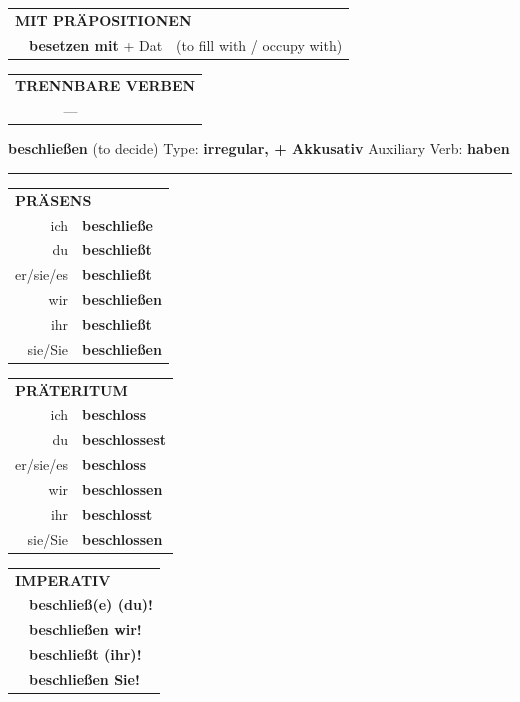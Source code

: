 \documentclass[10pt,a4paper]{revtex4-2}
\begin{document}
\begin{verbbox-acc}
\vspace{10pt}

\begin{tabular}{lll}
\multicolumn{3}{l}{\textbf{MIT PRÄPOSITIONEN}}\\
& \textbf{besetzen mit} + Dat & (to fill with / occupy with)\\
\end{tabular}
\hfill
\begin{tabular}{lll}
\multicolumn{3}{l}{\textbf{TRENNBARE VERBEN}}\\
& ---\\
\end{tabular}
\vspace{-5pt}
\end{verbbox-acc}

\begin{verbbox-acc}
{\Large \bf beschließen} (to decide) \hfill Type: \textbf{irregular, + Akkusativ} \hfill Auxiliary Verb: \textbf{haben}

\vspace{5pt}
\hrule
\vspace{5pt}

\begin{tabular}{rl}
\multicolumn{2}{l}{\textbf{PRÄSENS}}\\
ich & \textbf{beschließe}\\
du & \textbf{beschließt}\\
er/sie/es & \textbf{beschließt}\\
wir & \textbf{beschließen}\\
ihr & \textbf{beschließt}\\
sie/Sie & \textbf{beschließen}\\
\end{tabular}
\hfill
\begin{tabular}{rl}
\multicolumn{2}{l}{\textbf{PRÄTERITUM}}\\
ich & \textbf{beschloss}\\
du & \textbf{beschlossest}\\
er/sie/es & \textbf{beschloss}\\
wir & \textbf{beschlossen}\\
ihr & \textbf{beschlosst}\\
sie/Sie & \textbf{beschlossen}\\
\end{tabular}
\hfill
\begin{tabular}{rl}
\multicolumn{2}{l}{\textbf{IMPERATIV}}\\
& \textbf{beschließ(e) (du)!}\\
& \textbf{beschließen wir!}\\
& \textbf{beschließt (ihr)!}\\
& \textbf{beschließen Sie!}\\
\end{tabular}


\end{verbbox-acc}
\end{document}
